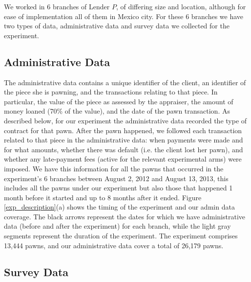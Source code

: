 \documentclass[oneside,11pt]{article}
\begin{document}
We worked in 6 branches of Lender $P$, of differing size and location, although for ease of implementation all of them in Mexico city. For these 6 branches we have two types of data, administrative data and survey data we collected for the experiment. 

\subsection{Administrative Data}
The administrative data contains a unique identifier of the client, an identifier of the piece she is pawning, and the transactions relating to that piece. In particular, the value of the piece as assessed by the appraiser, the amount of money loaned (70\% of the value), and the date of the pawn transaction. As described below, for our experiment the administrative data recorded the type of contract for that pawn. After the pawn happened, we followed each transaction related to that piece in the administrative data: when payments were made and for what amounts, whether there was default (i.e. the client lost her pawn), and whether any late-payment fees (active for the relevant experimental arms) were imposed. We have this information for all the pawns that occurred in the experiment's 6 branches between August 2, 2012 and August 13, 2013, this includes all the pawns under our experiment but also those that happened 1 month before it started and up to 8 months after it ended. Figure \ref{exp_description}(a) shows the timing of the experiment and our admin data coverage. The black arrows represent the dates for which we have administrative data (before and after the experiment) for each branch, while the light gray segments represent the duration of the experiment. The experiment comprises 13,444 pawns, and our administrative data cover a total of 26,179 pawns.

\subsection{Survey Data} 
\end{document}

